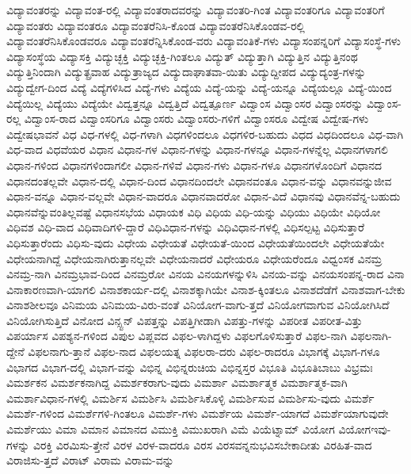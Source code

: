 {ವಿದ್ಯಾವಂತರನ್ನು
ವಿದ್ಯಾವಂತ-ರಲ್ಲಿ
ವಿದ್ಯಾವಂತರಾದವರನ್ನು
ವಿದ್ಯಾವಂತರಿ-ಗಿಂತ
ವಿದ್ಯಾವಂತರಿಗೂ
ವಿದ್ಯಾವಂತರಿಗೆ
ವಿದ್ಯಾವಂತರು
ವಿದ್ಯಾವಂತರೂ
ವಿದ್ಯಾವಂತರೆನಿಸಿ-ಕೊಂಡ
ವಿದ್ಯಾವಂತರೆನಿಸಿಕೊಂಡವ-ರಲ್ಲಿ
ವಿದ್ಯಾವಂತರೆನಿಸಿಕೊಂಡವರೂ
ವಿದ್ಯಾವಂತರೆನ್ನಿಸಿಕೊಂಡ-ವರು
ವಿದ್ಯಾವಂತಿಕೆ-ಗಳು
ವಿದ್ಯಾಸಂಪನ್ನರಿಗೆ
ವಿದ್ಯಾಸಂಸ್ಥೆ-ಗಳು
ವಿದ್ಯಾಸಂಸ್ಥೆಯ
ವಿದ್ಯಾಸಕ್ತಿ
ವಿದ್ಯುಚ್ಛಕ್ತಿ
ವಿದ್ಯುಚ್ಛಕ್ತಿ-ಗಿಂತಲೂ
ವಿದ್ಯುತ್
ವಿದ್ಯುತ್ತಾಗಿ
ವಿದ್ಯುತ್ತಿನ
ವಿದ್ಯುತ್ತಿನಂಥ
ವಿದ್ಯುತ್ತಿನಿಂದಾಗಿ
ವಿದ್ಯುತ್ಪ್ರವಾಹ
ವಿದ್ಯುತ್ರಾಜ್ಯದ
ವಿದ್ಯುದಾಘಾತವಾ-ಯಿತು
ವಿದ್ಯುದ್ದೀಪದ
ವಿದ್ಯುದ್ಯಂತ್ರ-ಗಳನ್ನು
ವಿದ್ಯುದ್ವೇಗ-ದಿಂದ
ವಿದ್ಯೆ
ವಿದ್ಯೆಗಳಿಸಿದ
ವಿದ್ಯೆ-ಗಳು
ವಿದ್ಯೆಯ
ವಿದ್ಯೆ-ಯನ್ನು
ವಿದ್ಯೆ-ಯನ್ನೂ
ವಿದ್ಯೆಯಲ್ಲೂ
ವಿದ್ಯೆ-ಯಿಂದ
ವಿದ್ಯೆಯಿಲ್ಲ
ವಿದ್ಯೆಯು
ವಿದ್ಯೆಯೇ
ವಿದ್ವತ್ತನ್ನೂ
ವಿದ್ವತ್ತಿದೆ
ವಿದ್ವತ್ಪೂರ್ಣ
ವಿದ್ವಾಂಸ
ವಿದ್ವಾಂಸರ
ವಿದ್ವಾಂಸರನ್ನು
ವಿದ್ವಾಂಸ-ರಲ್ಲ
ವಿದ್ವಾಂಸ-ರಾದ
ವಿದ್ವಾಂಸರಿಗೂ
ವಿದ್ವಾಂಸರು
ವಿದ್ವಾಂಸರು-ಗಳಿಗೆ
ವಿದ್ವಾಂಸರೂ
ವಿದ್ವೇಷ
ವಿದ್ವೇಷ-ಗಳು
ವಿದ್ವೇಷಭಾವನೆ
ವಿಧ
ವಿಧ-ಗಳಲ್ಲಿ
ವಿಧ-ಗಳಾಗಿ
ವಿಧಗಳಿಂದಲೂ
ವಿಧಗಳಿರ-ಬಹುದು
ವಿಧದ
ವಿಧದಿಂದಲೂ
ವಿಧ-ವಾಗಿ
ವಿಧ-ವಾದ
ವಿಧವೆಯರ
ವಿಧಾನ
ವಿಧಾನ-ಗಳ
ವಿಧಾನ-ಗಳನ್ನು
ವಿಧಾನ-ಗಳನ್ನೂ
ವಿಧಾನ-ಗಳನ್ನೆಲ್ಲ
ವಿಧಾನಗಳಾಗಲಿ
ವಿಧಾನ-ಗಳಿಂದ
ವಿಧಾನಗಳಿಂದಾಗಲೀ
ವಿಧಾನ-ಗಳಿವೆ
ವಿಧಾನ-ಗಳು
ವಿಧಾನ-ಗಳೂ
ವಿಧಾನಗಳೊಂದಿಗೆ
ವಿಧಾನದ
ವಿಧಾನದಂತಲ್ಲವೇ
ವಿಧಾನ-ದಲ್ಲಿ
ವಿಧಾನ-ದಿಂದ
ವಿಧಾನದಿಂದಲೇ
ವಿಧಾನವಂತೂ
ವಿಧಾನ-ವನ್ನು
ವಿಧಾನವನ್ನುಜೀವ
ವಿಧಾನ-ವನ್ನೂ
ವಿಧಾನ-ವಲ್ಲವೇ
ವಿಧಾನ-ವಾದರೂ
ವಿಧಾನವಾದರೋ
ವಿಧಾನ-ವಿದೆ
ವಿಧಾನವು
ವಿಧಾನವೆನ್ನ-ಬಹುದು
ವಿಧಾನವೆನ್ನುವಂತಿಲ್ಲವಷ್ಟೆ
ವಿಧಾನಸಭೆಯ
ವಿಧಾಯಕ
ವಿಧಿ
ವಿಧಿಯ
ವಿಧಿ-ಯನ್ನು
ವಿಧಿಯು
ವಿಧಿಯೇ
ವಿಧಿಯೋ
ವಿಧಿವಶ
ವಿಧಿ-ವಾದ
ವಿಧಿವಾದಿಗಳಿ-ದ್ದಾರೆ
ವಿಧಿವಿಧಾನ-ಗಳನ್ನು
ವಿಧಿವಿಧಾನ-ಗಳಲ್ಲಿ
ವಿಧಿಸಲ್ಪಟ್ಟ
ವಿಧಿಸುತ್ತಾರೆ
ವಿಧಿಸುತ್ತಾರೆಂದು
ವಿಧಿಸು-ವುದು
ವಿಧೇಯ
ವಿಧೇಯತೆ
ವಿಧೇಯತೆ-ಯಿಂದ
ವಿಧೇಯತೆಯಿಂದಲೇ
ವಿಧೇಯತೆಯೇ
ವಿಧೇಯನಾಗಿದ್ದೆ
ವಿಧೇಯನಾಗಿರುತ್ತಾನಲ್ಲವೇ
ವಿಧೇಯನಾದರೆ
ವಿಧೇಯರೂ
ವಿಧೇಯರೆಂದೂ
ವಿಧ್ವಂಸಕ
ವಿನಮ್ರ
ವಿನಮ್ರ-ನಾಗಿ
ವಿನಮ್ರಭಾವ-ದಿಂದ
ವಿನಮ್ರರೋ
ವಿನಯ
ವಿನಯಗಳನ್ನುಳಿಸಿ
ವಿನಯ-ವನ್ನು
ವಿನಯಸಂಪನ್ನ-ರಾದ
ವಿನಾ
ವಿನಾಕಾರಣವಾಗಿ-ಯಾಗಲಿ
ವಿನಾಶಕಾರ್ಯ-ದಲ್ಲಿ
ವಿನಾಶಕ್ಕಾಗಿಯೇ
ವಿನಾಶ-ಕ್ಕಿಂತಲೂ
ವಿನಾಶದೆಡೆಗೆ
ವಿನಾಶವಾಗ-ಬೇಕು
ವಿನಾಶಶೀಲವೂ
ವಿನಿಮಯ
ವಿನಿಮಯ-ವಿರು-ವಂತೆ
ವಿನಿಯೋಗ-ವಾಗು-ತ್ತದೆ
ವಿನಿಯೋಗವಾಗುವ
ವಿನಿಯೋಗಿಸಿದೆ
ವಿನಿಯೋಗಿಸುತ್ತಿದೆ
ವಿನೋದ
ವಿನ್ಸ್ಟನ್
ವಿಪತ್ತನ್ನು
ವಿಪತ್ತಿಗೀಡಾಗಿ
ವಿಪತ್ತು-ಗಳನ್ನು
ವಿಪರೀತ
ವಿಪರೀತ-ವಿತ್ತು
ವಿಪರ್ಯಾಸ
ವಿಪಶ್ಯನ-ಗಳಿಂದ
ವಿಪುಲ
ವಿಪ್ಲವದ
ವಿಫಲ-ಳಾಗಿದ್ದಳು
ವಿಫಲಗೊಳಿಸುತ್ತಾರೆ
ವಿಫಲ-ನಾಗಿ
ವಿಫಲನಾಗಿ-ದ್ದೇನೆ
ವಿಫಲನಾಗು-ತ್ತಾನೆ
ವಿಫಲ-ನಾದ
ವಿಫಲಯತ್ನ
ವಿಫಲರಾ-ದರು
ವಿಫಲ-ರಾದರೂ
ವಿಭಾಗಕ್ಕೆ
ವಿಭಾಗ-ಗಳೂ
ವಿಭಾಗದ
ವಿಭಾಗ-ದಲ್ಲಿ
ವಿಭಾಗ-ವನ್ನು
ವಿಭಿನ್ನ
ವಿಭಿನ್ನರುಚಿಯ
ವಿಭಿನ್ನಸ್ತರ
ವಿಭೂತಿ
ವಿಭೂತಿಬಾಬು
ವಿಭ್ರಮಃ
ವಿಮರ್ಶಕನ
ವಿಮರ್ಶಕನಾಗಿದ್ದ
ವಿಮರ್ಶಕರಾಗು-ವುದು
ವಿಮರ್ಶಾ
ವಿಮರ್ಶಾತ್ಮಕ
ವಿಮರ್ಶಾತ್ಮಕ-ವಾಗಿ
ವಿಮರ್ಶಾವಿಧಾನ-ಗಳಲ್ಲಿ
ವಿಮರ್ಶಿಸ
ವಿಮರ್ಶಿಸಿ
ವಿಮರ್ಶಿಸಿಕೊಳ್ಳಿ
ವಿಮರ್ಶಿಸುವ
ವಿಮರ್ಶಿಸು-ವುದು
ವಿಮರ್ಶೆ
ವಿಮರ್ಶೆ-ಗಳಿಂದ
ವಿಮರ್ಶೆಗಳಿ-ಗಿಂತಲೂ
ವಿಮರ್ಶೆ-ಗಳು
ವಿಮರ್ಶೆಯ
ವಿಮರ್ಶೆ-ಯಾಗದೆ
ವಿಮರ್ಶೆಯಾಗುವುದೇ
ವಿಮರ್ಶೆಯು
ವಿಮಾ
ವಿಮಾನ
ವಿಮಾನದ
ವಿಮುಕ್ತಿ
ವಿಮುಖರಾಗಿ
ವಿಮೆ
ವಿಯೆಟ್ನಾಮ್
ವಿಯೋಗ
ವಿಯೋಗಇವು-ಗಳನ್ನು
ವಿರಕ್ತಿ
ವಿರಮಿಸು-ತ್ತೇನೆ
ವಿರಳ
ವಿರಳ-ವಾದರೂ
ವಿರಸ
ವಿರಸವನ್ನನುಭವಿಸಬೇಕಾದೀತು
ವಿರಹಿತ-ವಾದ
ವಿರಾಜಿಸು-ತ್ತದೆ
ವಿರಾಟ್
ವಿರಾಮ
ವಿರಾಮ-ವನ್ನು
}
